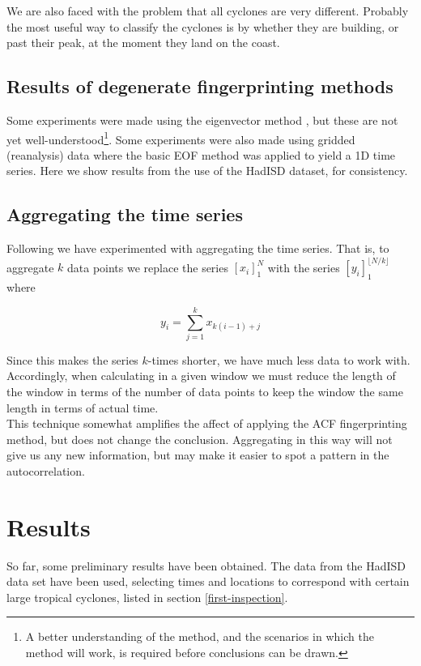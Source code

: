 \documentclass[11pt,a4paper,reqno]{article}
\numberwithin{equation}{section}
\begin{document}
We are also faced with the problem that all cyclones are very different. Probably the most useful way to classify the cyclones is by whether they are building, or past their peak, at the moment they land on the coast.


\subsection{Results of degenerate fingerprinting methods}

Some experiments were made using the eigenvector method \cite{williamson2015}, but these are not yet well-understood\footnote{A better understanding of the method, and the scenarios in which the method will work, is required before conclusions can be drawn.}. Some experiments were also made using gridded (reanalysis) data where the basic EOF method was applied to yield a 1D time series. Here we show results from the use of the HadISD dataset, for consistency. 


\subsection{Aggregating the time series}

Following \cite{} we have experimented with aggregating the time series. That is, to aggregate $k$ data points we replace the series $[x_i]_1^N$ with the series $[y_i]_1^{\lfloor N/k \rfloor}$ where

\begin{equation}
y_i = \sum_{j=1}^k x_{k(i-1)+j}
\end{equation}

Since this makes the series $k$-times shorter, we have much less data to work with. Accordingly, when calculating in a given window we must reduce the length of the window in terms of the number of data points to keep the window the same length in terms of actual time.\\

This technique somewhat amplifies the affect of applying the ACF fingerprinting method, but does not change the conclusion. Aggregating in this way will not give us any new information, but may make it easier to spot a pattern in the autocorrelation. 





\section{Results}
\label{results}
So far, some preliminary results have been obtained. The data from the HadISD data set have been used, selecting times and locations to correspond with certain large tropical cyclones, listed in section \ref{first-inspection}.\\ 
\end{document}
